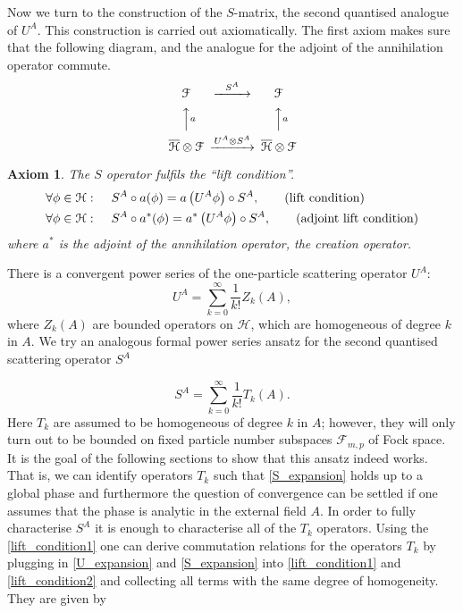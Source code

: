 \documentclass[b5paper,draft,openbib,12pt]{memoir}
\newtheorem{axiom}[Def]{Axiom}
\begin{document}
Now we turn to the construction of the \(S\)-matrix, the second quantised analogue of \(U^A\). This construction is carried out axiomatically. The first axiom makes sure that the following diagram, and the analogue for the adjoint of the annihilation operator commute.
\begin{equation}
\begin{CD}								%
\mathcal{F}     @>S^A>>  \mathcal{F}\\
@AAaA        @AAaA\\
\overline{\mathcal{H}}\otimes \mathcal{F}     @>U^A\otimes S^A>>  \overline{\mathcal{H}}\otimes \mathcal{F} 
\end{CD}
\end{equation}
\begin{axiom}
The \(S\) operator fulfils the ``lift condition''.
\begin{align}\label{lift_condition1}
\forall \phi\in \mathcal{H}:& \hspace{0.5cm} S^A \circ a(\phi)=a\left( U^A \phi \right)  \circ S^A,\tag{lift condition}\\
\label{lift_condition2}
\forall \phi\in \mathcal{H}:& \hspace{0.5cm} S^A \circ a^*(\phi)=a^*\left( U^A \phi \right)  \circ S^A,\tag{adjoint lift condition}
\end{align}
where \(a^*\) is the adjoint of the annihilation operator, the creation operator. 
\end{axiom}

There is a convergent power series of the one-particle scattering operator \(U^A\):
\begin{equation}\label{U_expansion}
U^A = \sum_{k=0}^\infty \frac{1}{k!} Z_k(A),
\end{equation}
where \(Z_k(A)\) are bounded operators on \(\mathcal{H}\), which are homogeneous of degree \(k\) in \(A\).
We try an analogous formal power series ansatz for the second quantised scattering operator \(S^A\)

\begin{equation}\label{S_expansion}
S^A=\sum_{k=0}^\infty \frac{1}{k!} T_k(A).
\end{equation}
Here \(T_k\) are assumed to be homogeneous of degree \(k\) in \(A\); however, they will only turn out to be bounded on
fixed particle number subspaces \(\mathcal{F}_{m,p}\) of Fock space. It is the goal of the following  sections to
show that this ansatz indeed works. That is, we can identify operators \(T_k\) such that \eqref{S_expansion}
holds up to a global phase and furthermore the question of convergence can be settled if one assumes that 
the phase is analytic in the external field \(A\). %
In order to fully characterise \(S^A\) it is enough to characterise all of the \(T_k\) operators. 
Using the \eqref{lift_condition1} one can derive commutation relations for the operators 
\(T_k\) by plugging in \eqref{U_expansion} and \eqref{S_expansion} into \eqref{lift_condition1} and \eqref{lift_condition2}
and collecting all terms with the same degree of homogeneity. They are given by
\end{document}
